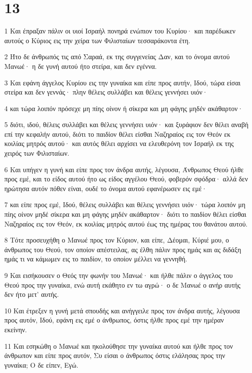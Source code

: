 \chapter{13}

\par 1 Και έπραξαν πάλιν οι υιοί Ισραήλ πονηρά ενώπιον του Κυρίου· και παρέδωκεν αυτούς ο Κύριος εις την χείρα των Φιλισταίων τεσσαράκοντα έτη.
\par 2 Ήτο δε άνθρωπός τις από Σαραά, εκ της συγγενείας Δαν, και το όνομα αυτού Μανωέ· η δε γυνή αυτού ήτο στείρα, και δεν εγέννα.
\par 3 Και εφάνη άγγελος Κυρίου εις την γυναίκα και είπε προς αυτήν, Ιδού, τώρα είσαι στείρα και δεν γεννάς· πλην θέλεις συλλάβει και θέλεις γεννήσει υιόν·
\par 4 και τώρα λοιπόν πρόσεχε μη πίης οίνον ή σίκερα και μη φάγης μηδέν ακάθαρτον·
\par 5 διότι, ιδού, θέλεις συλλάβει και θέλεις γεννήσει υιόν· και ξυράφιον δεν θέλει αναβή επί την κεφαλήν αυτού, διότι το παιδίον θέλει είσθαι Ναζηραίος εις τον Θεόν εκ κοιλίας μητρός αυτού· και αυτός θέλει αρχίσει να ελευθερόνη τον Ισραήλ εκ της χειρός των Φιλισταίων.
\par 6 Και υπήγεν η γυνή και είπε προς τον άνδρα αυτής, λέγουσα, Άνθρωπος Θεού ήλθε προς εμέ, και το είδος αυτού ήτο ως είδος αγγέλου Θεού, φοβερόν σφόδρα· αλλά δεν ηρώτησα αυτόν πόθεν είναι, ουδέ το όνομα αυτού εφανέρωσεν εις εμέ·
\par 7 και είπε προς εμέ, Ιδού, θέλεις συλλάβει και θέλεις γεννήσει υιόν· τώρα λοιπόν μη πίης οίνον μηδέ σίκερα και μη φάγης μηδέν ακάθαρτον· διότι το παιδίον θέλει είσθαι Ναζηραίος εις τον Θεόν, εκ κοιλίας μητρός αυτού έως της ημέρας του θανάτου αυτού.
\par 8 Τότε προσευχήθη ο Μανωέ προς τον Κύριον, και είπε, Δέομαι, Κύριέ μου, ο άνθρωπος του Θεού, τον οποίον απέστειλας, ας έλθη πάλιν προς ημάς και ας διδάξη ημάς τι να κάμωμεν εις το παιδίον, το οποίον μέλλει να γεννηθή.
\par 9 Και εισήκουσεν ο Θεός την φωνήν του Μανωέ· και ήλθε πάλιν ο άγγελος του Θεού προς την γυναίκα, ενώ αυτή εκάθητο εν τω αγρώ· ο δε Μανωέ ο ανήρ αυτής δεν ήτο μετ' αυτής.
\par 10 Και έτρεξεν η γυνή μετά σπουδής και ανήγγειλε προς τον άνδρα αυτής, λέγουσα προς αυτόν, Ιδού, εφάνη εις εμέ ο άνθρωπος, όστις ήλθε προς εμέ την ημέραν εκείνην.
\par 11 Και εσηκώθη ο Μανωέ και ηκολούθησε την γυναίκα αυτού και ήλθε προς τον άνθρωπον και είπε προς αυτόν, Συ είσαι ο άνθρωπος όστις ελάλησας προς την γυναίκα; Ο δε είπεν, Εγώ.
